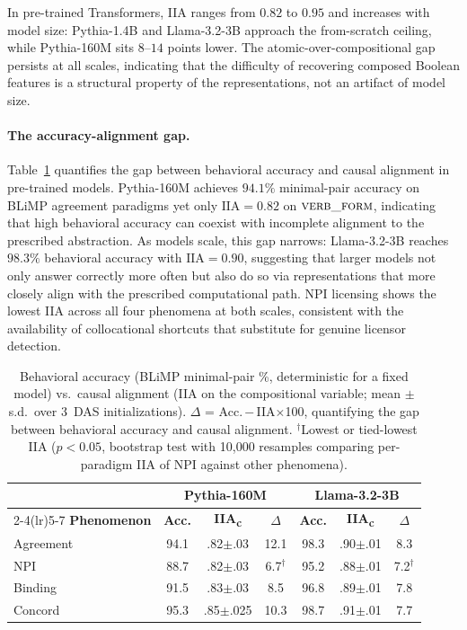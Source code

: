 \documentclass[11pt]{article}
\newcommand{\spm}[1]{{\scriptsize$\pm$#1}}
\begin{document}
In pre-trained Transformers, IIA ranges from $0.82$ to $0.95$ and increases with model size: Pythia-1.4B and Llama-3.2-3B approach the from-scratch ceiling, while Pythia-160M sits $8$--$14$ points lower.
The atomic-over-compositional gap persists at all scales, indicating that the difficulty of recovering composed Boolean features is a structural property of the representations, not an artifact of model size.

\paragraph{The accuracy-alignment gap.}
Table~\ref{tab:behav-gap} quantifies the gap between behavioral accuracy and causal alignment in pre-trained models.
Pythia-160M achieves $94.1\%$ minimal-pair accuracy on BLiMP agreement paradigms yet only $\mathrm{IIA} = 0.82$ on $\textsc{verb\_form}$, indicating that high behavioral accuracy can coexist with incomplete alignment to the prescribed abstraction.
As models scale, this gap narrows: Llama-3.2-3B reaches $98.3\%$ behavioral accuracy with $\mathrm{IIA} = 0.90$, suggesting that larger models not only answer correctly more often but also do so via representations that more closely align with the prescribed computational path.
NPI licensing shows the lowest IIA across all four phenomena at both scales, consistent with the availability of collocational shortcuts that substitute for genuine licensor detection.

\begin{table}[t]
\centering\footnotesize
\setlength{\tabcolsep}{3.0pt}
\begin{tabular}{@{}lcccccc@{}}
\toprule
& \multicolumn{3}{c}{\textbf{Pythia-160M}} & \multicolumn{3}{c}{\textbf{Llama-3.2-3B}} \\
\cmidrule(lr){2-4}\cmidrule(lr){5-7}
\textbf{Phenomenon} & \textbf{Acc.} & \textbf{IIA\textsubscript{c}} & $\Delta$ & \textbf{Acc.} & \textbf{IIA\textsubscript{c}} & $\Delta$ \\
\midrule
Agreement & 94.1 & .82\spm{.03} & 12.1 & 98.3 & .90\spm{.01} & 8.3 \\
NPI     & 88.7 & .82\spm{.03} & 6.7$^\dagger$  & 95.2 & .88\spm{.01} & 7.2$^\dagger$ \\
Binding   & 91.5 & .83\spm{.03} & 8.5  & 96.8 & .89\spm{.01} & 7.8 \\
Concord   & 95.3 & .85\spm{.025} & 10.3 & 98.7 & .91\spm{.01} & 7.7 \\
\bottomrule
\end{tabular}
\caption{Behavioral accuracy (BLiMP minimal-pair \%, deterministic for a fixed model) vs.\ causal alignment (IIA on the compositional variable; mean $\pm$ s.d.\ over 3~DAS initializations).
$\Delta$ = Acc.\,$-$\,IIA$\times$100, quantifying the gap between behavioral accuracy and causal alignment.
$^\dagger$Lowest or tied-lowest IIA ($p < 0.05$, bootstrap test with 10{,}000 resamples comparing per-paradigm IIA of NPI against other phenomena).}
\label{tab:behav-gap}
\end{table}
\end{document}

